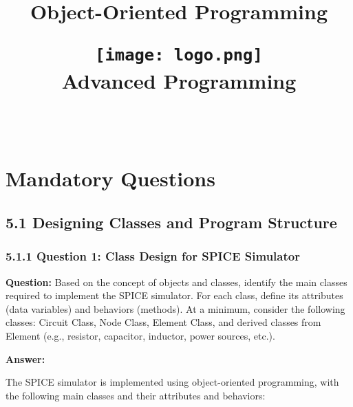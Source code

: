 \documentclass{article}
\title{Object-Oriented Programming \par \exerciseset}
\author{\FirstAuthor}
\title{
    \texttt{[image: logo.png]} \\ %
    Advanced Programming \par \exerciseset
}
\author{\FirstAuthor \\ \SecondAuthor}
\date{}
\begin{document}
\maketitle

\section*{Mandatory Questions}

\subsection*{5.1 Designing Classes and Program Structure}

\subsubsection*{5.1.1 Question 1: Class Design for SPICE Simulator}

\textbf{Question:} Based on the concept of objects and classes, identify the main classes required to implement the SPICE simulator. For each class, define its attributes (data variables) and behaviors (methods). At a minimum, consider the following classes: Circuit Class, Node Class, Element Class, and derived classes from Element (e.g., resistor, capacitor, inductor, power sources, etc.).

\textbf{Answer:}

The SPICE simulator is implemented using object-oriented programming, with the following main classes and their attributes and behaviors:
\end{document}

